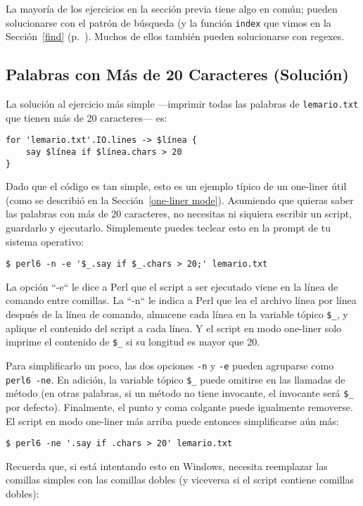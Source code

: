 La mayoría de los ejercicios en la sección previa tiene algo en
común; pueden solucionarse con el patrón de búsqueda (y la función
{\tt index} que vimos en la Sección~\ref{find} 
(p.~\pageref{find}). Muchos de ellos también pueden solucionarse
con regexes.

\subsection{Palabras con Más de 20 Caracteres (Solución)}

La solución al ejercicio más simple ---imprimir todas las palabras
de {\tt lemario.txt} que tienen más de 20 caracteres--- es:

\begin{verbatim}
for 'lemario.txt'.IO.lines -> $línea {
    say $línea if $línea.chars > 20
}
\end{verbatim}
%

Dado que el código es tan simple, esto es un ejemplo típico
de un one-liner útil (como se describió en la 
Sección~\ref{one-liner mode}). Asumiendo que quieras saber las
palabras con más de 20 caracteres, no necesitas ni siquiera escribir
un script, guardarlo y ejecutarlo. Simplemente puedes teclear esto
en la prompt de tu sistema operativo:
\label{one-liner-example}

\begin{verbatim}
$ perl6 -n -e '$_.say if $_.chars > 20;' lemario.txt
\end{verbatim} 
%
La opción ``-e`` le dice a Perl que el script a ser ejecutado
viene en la línea de comando entre comillas. La ``-n`` le indica
a Perl que lea el archivo línea por línea después de la línea
de comando, almacene cada línea en la variable tópico \verb|$_|,
y aplique el contenido del script a cada línea. Y el script en modo
one-liner solo imprime el contenido de \verb|$_| si su longitud
es mayor que 20.

Para simplificarlo un poco, las dos opciones \verb|-n| y \verb|-e|
pueden agruparse como \verb|perl6 -ne|. En adición, la variable tópico
\verb|$_| puede omitirse en las llamadas de método (en otras palabras,
si un método no tiene invocante, el invocante será \verb|$_| por defecto).
Finalmente, el punto y coma colgante puede igualmente removerse.
El script en modo one-liner más arriba puede entonces simplificarse
aún más:

\begin{verbatim}
$ perl6 -ne '.say if .chars > 20' lemario.txt
\end{verbatim} 
%
Recuerda que, si está intentando esto en Windows, necesita reemplazar las 
comillas simples con las comillas dobles (y viceversa si el script
contiene comillas dobles):

